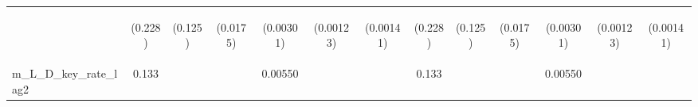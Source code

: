 \documentclass[]{article}
\begin{document}
\begin{center}
\begin{tabular}{lcccccccccccc}
\vspace{4pt} & \begin{footnotesize}(0.228)\end{footnotesize} & \begin{footnotesize}(0.125)\end{footnotesize} & \begin{footnotesize}(0.0175)\end{footnotesize} & \begin{footnotesize}(0.00301)\end{footnotesize} & \begin{footnotesize}(0.00123)\end{footnotesize} & \begin{footnotesize}(0.00141)\end{footnotesize} & \begin{footnotesize}(0.228)\end{footnotesize} & \begin{footnotesize}(0.125)\end{footnotesize} & \begin{footnotesize}(0.0175)\end{footnotesize} & \begin{footnotesize}(0.00301)\end{footnotesize} & \begin{footnotesize}(0.00123)\end{footnotesize} & \begin{footnotesize}(0.00141)\end{footnotesize} \\
m\_L\_D\_key\_rate\_lag2 & 0.133 &  &  & 0.00550 &  &  & 0.133 &  &  & 0.00550 &  &  \\

\end{tabular}
\end{center}
\end{document}
